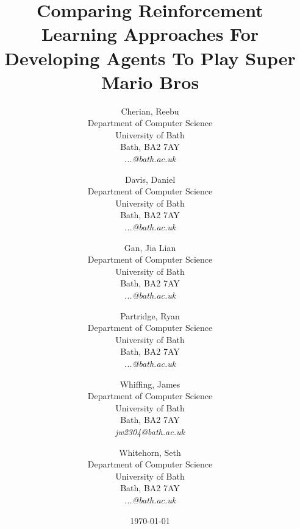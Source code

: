 \title{Comparing Reinforcement Learning Approaches For Developing Agents To Play Super Mario Bros}
\renewcommand\maketitlehookb{\centering \Large CM50270 - Coursework 2 - Group Report}
\date{\today}
\author{
    Cherian, Reebu \\
    Department of Computer Science\\
    University of Bath\\
    Bath, BA2 7AY \\
    \textit{...@bath.ac.uk} \\
    \and
    Davis, Daniel\\
    Department of Computer Science\\
    University of Bath\\
    Bath, BA2 7AY \\
    \textit{...@bath.ac.uk} \\
    \and
    Gan, Jia Lian\\
    Department of Computer Science\\
    University of Bath\\
    Bath, BA2 7AY \\
    \textit{...@bath.ac.uk} \\
    \and
    Partridge, Ryan\\
    Department of Computer Science\\
    University of Bath\\
    Bath, BA2 7AY \\
    \textit{...@bath.ac.uk} \\
    \and
    Whiffing, James\\
    Department of Computer Science\\
    University of Bath\\
    Bath, BA2 7AY \\
    \textit{jw2304@bath.ac.uk} \\
    \and
    Whitehorn, Seth\\
    Department of Computer Science\\
    University of Bath\\
    Bath, BA2 7AY \\
    \textit{...@bath.ac.uk} \\
}

\maketitle

\clearpage
\restoregeometry
\newpage

\setcounter{page}{0}
\pagestyle{fancy}


\tableofcontents
\clearpage
\newpage
{}
\listoffigures
\clearpage
\newpage
{}
\listoftables
\clearpage
\newpage


\setcounter{page}{1}

